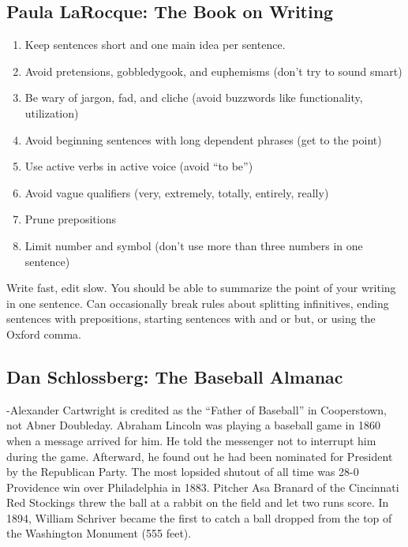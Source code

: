 \documentclass[
]{article}
\begin{document}
\hypertarget{paula-larocque-the-book-on-writing}{%
\subsection{Paula LaRocque: The Book on
Writing}\label{paula-larocque-the-book-on-writing}}

\begin{enumerate}
\def\labelenumi{\arabic{enumi}.}
\item
  Keep sentences short and one main idea per sentence.
\item
  Avoid pretensions, gobbledygook, and euphemisms (don't try to sound
  smart)
\item
  Be wary of jargon, fad, and cliche (avoid buzzwords like
  functionality, utilization)
\item
  Avoid beginning sentences with long dependent phrases (get to the
  point)
\item
  Use active verbs in active voice (avoid ``to be'')
\item
  Avoid vague qualifiers (very, extremely, totally, entirely, really)
\item
  Prune prepositions
\item
  Limit number and symbol (don't use more than three numbers in one
  sentence)
\end{enumerate}

Write fast, edit slow. You should be able to summarize the point of your
writing in one sentence. Can occasionally break rules about splitting
infinitives, ending sentences with prepositions, starting sentences with
and or but, or using the Oxford comma.

\hypertarget{dan-schlossberg-the-baseball-almanac}{%
\subsection{Dan Schlossberg: The Baseball
Almanac}\label{dan-schlossberg-the-baseball-almanac}}

-Alexander Cartwright is credited as the ``Father of Baseball'' in
Cooperstown, not Abner Doubleday. Abraham Lincoln was playing a baseball
game in 1860 when a message arrived for him. He told the messenger not
to interrupt him during the game. Afterward, he found out he had been
nominated for President by the Republican Party. The most lopsided
shutout of all time was 28-0 Providence win over Philadelphia in 1883.
Pitcher Asa Branard of the Cincinnati Red Stockings threw the ball at a
rabbit on the field and let two runs score. In 1894, William Schriver
became the first to catch a ball dropped from the top of the Washington
Monument (555 feet).
\end{document}
